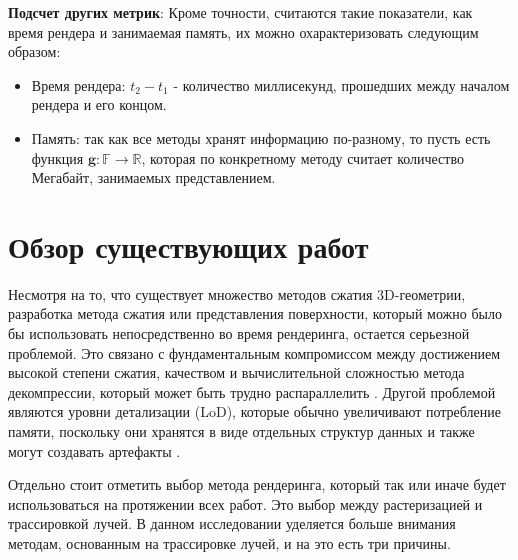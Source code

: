 \documentclass[a4paper,hidelinks,12pt]{article}
\begin{document}
\textbf{Подсчет других метрик}: \newline Кроме точности, считаются такие показатели, как время рендера и занимаемая память, их можно охарактеризовать следующим образом:

\begin{itemize}[leftmargin=4em]
	\item Время рендера: $t_2 - t_1$ - количество миллисекунд, прошедших между началом рендера и его концом.
	\item Память: так как все методы хранят информацию по-разному, то пусть есть функция $\textbf{g} : \mathbb{F} \to \mathbb{R}$, которая по конкретному методу считает количество Мегабайт, занимаемых представлением.
\end{itemize}

\newpage

\section{Обзор существующих работ}

Несмотря на то, что существует множество методов сжатия 3D-геометрии, разработка метода сжатия или представления 
поверхности, который можно было бы использовать непосредственно во время рендеринга, остается серьезной проблемой. 
Это связано с фундаментальным компромиссом между достижением высокой степени сжатия, качеством и вычислительной сложностью 
метода декомпрессии, который может быть трудно распараллелить \cite{DGF}\cite{Meshlet}\cite{fly_fly}. 
Другой проблемой являются уровни детализации (LoD), которые обычно увеличивают потребление памяти, поскольку они хранятся в виде отдельных 
структур данных и также могут создавать артефакты \cite{LA_lods}\cite{micromesh}. 

Отдельно стоит отметить выбор метода рендеринга, который так или иначе будет использоваться на протяжении всех работ. 
Это выбор между растеризацией и трассировкой лучей. В данном исследовании уделяется больше внимания методам, основанным 
на трассировке лучей, и на это есть три причины.
\end{document}
